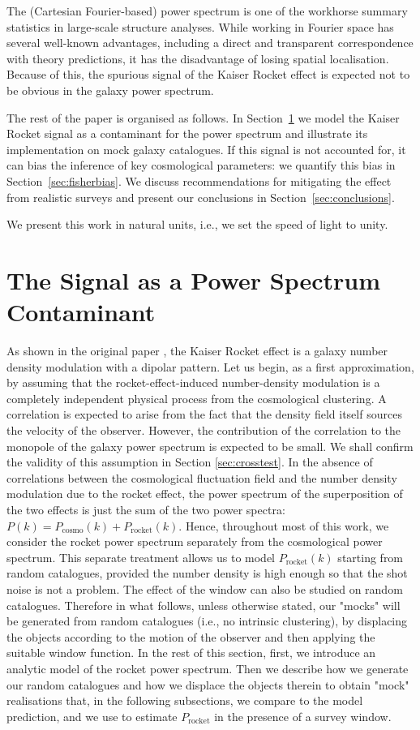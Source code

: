 \documentclass[a4paper,11pt]{article}
\begin{document}
The (Cartesian Fourier-based) power spectrum is one of the workhorse summary statistics in large-scale structure analyses. While working in Fourier space has several well-known advantages, including a direct and transparent correspondence with theory predictions, it has the disadvantage of losing spatial localisation. Because of this, the spurious signal of the  Kaiser Rocket effect is expected not to be obvious in the galaxy power spectrum.

The rest of the paper is organised as follows. 
In Section~\ref{sec:meth} we model the Kaiser Rocket signal as a contaminant for the power spectrum and illustrate its implementation on mock galaxy catalogues. If this signal is not accounted for, it can bias the inference of key cosmological parameters: we quantify this bias in Section~\ref{sec:fisherbias}.  We discuss recommendations for mitigating the effect from realistic surveys and present our conclusions in Section~\ref{sec:conclusions}.  

We present this work in natural units, i.e., we set the speed of light to unity.

\section{The Signal as a Power Spectrum Contaminant}
\label{sec:meth}
As shown in the original paper \cite{Kaiser:1987qv}, the Kaiser Rocket effect is a galaxy number density modulation with a dipolar pattern.  
Let us begin, 
as a first approximation, by assuming  that the rocket-effect-induced number-density modulation is a completely independent physical process from the cosmological clustering. A correlation is expected to arise from the fact that the density field itself sources the velocity of the observer.  However,  the contribution of the correlation to the monopole of the galaxy power spectrum is expected to be small. 
We shall confirm the validity of this assumption in Section \ref{sec:crosstest}. 
In the absence of correlations between the cosmological fluctuation field and the number density modulation due to the rocket effect, the power spectrum of the superposition of the two effects is just the sum of the two power spectra: $P(k)=P_\mathrm{cosmo}(k)+ P_\mathrm{rocket}(k)$. Hence, throughout most of this work, we consider the rocket power spectrum separately from the cosmological power spectrum. This separate treatment allows us to model $P_\mathrm{rocket}(k)$ starting from random catalogues, provided the number density is high enough so that the shot noise is not a problem. The effect of the window can also be studied on random catalogues. Therefore in what follows, unless otherwise stated, our "mocks" will be generated from random catalogues (i.e., no intrinsic clustering), by displacing the objects according to the motion of the observer and then applying the suitable window function. In the rest of this section,  first, we introduce an analytic model of the rocket power spectrum. Then we describe how we generate our random catalogues and how we displace the objects therein to obtain "mock" realisations that, in the following subsections, we compare to the model prediction, and we use to estimate $P_\mathrm{rocket}$ in the presence of a survey window. 
\end{document}
